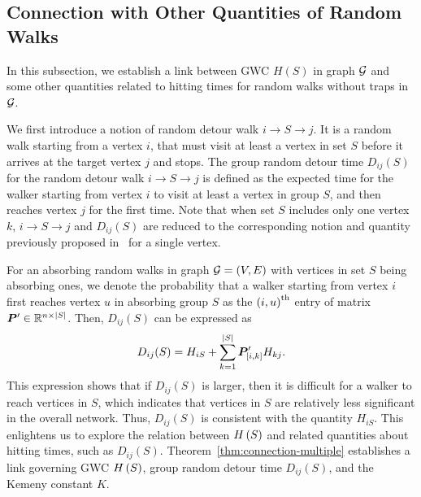 \documentclass[10pt,twocolumn,twoside]{IEEEtran}
\begin{document}

\subsection{Connection with Other Quantities of Random Walks}




In this subsection, we establish a link between GWC $H(S)$  in graph \(\mathcal{G}\) and some other quantities related to hitting times for random walks without traps in \(\mathcal{G}\).

We first introduce a notion of random detour walk $i\rightarrow S \rightarrow j$. It is a random walk starting from a vertex $i$, that must visit at least a vertex in set $S$ before it arrives at the target vertex $j$ and stops. The group random detour time  \(D_{ij}(S)\) for the random detour walk $i\rightarrow S \rightarrow j$ is defined as the expected time for the walker starting from vertex \(i\) to visit at least a vertex in group \(S\), and then reaches vertex \(j\) for the first time. Note that when set $S$ includes only one vertex $k$, $i\rightarrow S \rightarrow j$ and \(D_{ij}(S)\) are reduced to the corresponding notion and quantity previously proposed in~\cite{RaZh13,BoRaZh11} for a single vertex.


For an absorbing random walks in graph \(\mathcal{G}=(V,E)\)  with vertices in set \(S\)  being absorbing ones,  we denote the probability that a walker starting from vertex \(i\) first reaches vertex \(u\) in absorbing group \(S\) as the \({(i,u)}^{\rm{th}}\) entry of matrix \(\boldsymbol{P}'\in\mathbb{R}^{n\times\left|S \right|}\). Then, \(D_{ij}(S)\) can be expressed as
\begin{equation}
    D_{ij}(S)= H_{iS}+\sum_{k=1}^{\left|S \right|}\boldsymbol{P}'_{[i,k]}H_{kj}.
\end{equation}
This expression shows that  if \(D_{ij}(S)\) is larger, then it is difficult for a walker to reach vertices in \(S\), which indicates that vertices in \(S\) are relatively less significant in the overall network. Thus, \(D_{ij}(S)\) is consistent with the quantity $H_{iS}$. This enlightens us to explore the relation between \(H\left(S\right)\) and related quantities about hitting times, such as  \(D_{ij}(S)\). Theorem~\ref{thm:connection-multiple} establishes a link governing GWC \(H\left(S\right)\), group random detour time \(D_{ij}(S)\), and the Kemeny constant \(K\).
\end{document}
